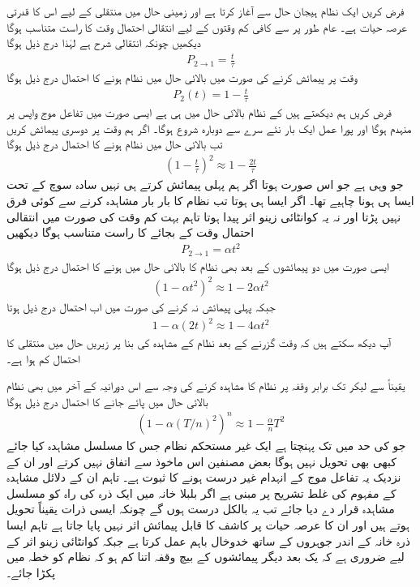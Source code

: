 فرض کریں ایک نظام ہیجان حال  سے آغاز کرتا ہے اور زمینی حال  میں منتقلی کے لیے اس کا قدرتی عرصہ حیات  ہے۔ عام طور پر  سے کافی کم وقتوں کے لیے انتقالی احتمال وقت  کا راست متناسب ہوگا  دیکھیں چونکہ انتقالی شرح  ہے لہٰذا درج ذیل ہوگا 
\begin{align}
	P_{2\to1}=\frac{t}{\tau}
\end{align}
وقت  پر پیمائش کرنے کی صورت میں بالائی حال میں نظام ہونے کا احتمال درج ذیل ہوگا
\begin{align}
	P_2(t)=1-\frac{t}{\tau}
\end{align}
فرض کریں ہم دیکھتے ہیں کے نظام بالائی حال میں ہی ہے ایسی صورت میں تفاعل موج واپس  پر منہدم ہوگا اور پورا عمل ایک بار نئے سرے سے دوبارہ شروع ہوگا۔ اگر ہم وقت  پر دوسری پیمائش کریں تب بالائی حال میں نظام ہونے کا احتمال درج ذیل ہوگا 
\begin{align}
	\left(1-\frac{t}{\tau}\right)^2\approx1-\frac{2t}{\tau}
\end{align}
جو وہی ہے جو اس صورت ہوتا اگر ہم پہلی پیمائش کرتے ہی نہیں سادہ سوچ کے تحت ایسا ہی ہونا چاہیے  تھا۔ اگر ایسا ہی ہوتا تب نظام کا بار بار مشاہدہ کرنے سے کوئی فرق نہیں پڑتا اور نہ یہ  کوانٹائی زینو اثر پیدا ہوتا تاہم بہت کم وقت کی صورت میں انتقالی احتمال وقت  کے بجائے  کا راست متناسب ہوگا  دیکھیں
\begin{align}
	P_{2\to1}=\alpha t^2
\end{align}
ایسی صورت میں دو پیمائشوں کے بعد بھی نظام کا بالائی حال میں ہونے کا احتمال درج ذیل ہوگا
\begin{align}
	\left(1-\alpha t^2\right)^2\approx 1-2\alpha t^2
\end{align}
جبکہ پہلی پیمائش نہ کرنے کی صورت میں اب احتمال درج ذیل ہوتا
\begin{align}
	1-\alpha(2t)^2\approx1-4\alpha t^2
\end{align}
آپ دیکھ سکتے ہیں کہ وقت  گزرنے کے بعد نظام کے مشاہدہ کی بنا پر زیریں حال میں منتقلی کا احتمال کم ہوا ہے۔

یقیناً  سے لیکر  تک  برابر وقفہ  پر نظام کا مشاہدہ کرنے کی وجہ سے اس دورانیہ کے آخر میں بھی نظام بالائی حال میں پائے جانے کا احتمال درج ذیل ہوگا
\begin{align}
	\left(1-\alpha(T/n)^2\right)^n\approx1-\frac{\alpha}{n}T^2
\end{align}
جو  کی حد میں  تک پہنچتا ہے ایک غیر مستحکم نظام جس کا مسلسل مشاہدہ کیا جائے کبھی بھی تحویل نہیں ہوگا بعض مصنفین اس ماخوذ  سے اتفاق نہیں کرتے اور ان کے نزدیک یہ تفاعل موج کے انہدام غیر درست ہونے کا ثبوت ہے۔ تاہم ان کے دلائل مشاہدہ کے مفہوم کی غلط تشریح پر مبنی ہے اگر بلبلا خانہ میں ایک ذرہ کی راہ کو مسلسل مشاہدہ قرار دے دیا جائے تب یہ بالکل درست ہوں گے چونکہ ایسی ذرات یقیناً تحویل ہوتے ہیں اور ان کا عرصہ حیات پر کاشف کا قابل پیمائش اثر نہیں پایا جاتا ہے تاہم ایسا ذرہ خانہ کے اندر جوہروں کے ساتھ خدوخال  باہم عمل کرتا ہے جبکہ کوانٹائی زینو اثر کے لیے ضروری ہے کہ یک بعد دیگر پیمائشوں کے بیچ وقفہ اتنا کم ہو کہ نظام کو  خطہ میں پکڑا جائے۔

